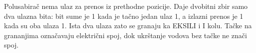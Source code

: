 Polusabirač nema ulaz za prenos iz prethodne pozicije. Daje dvobitni zbir samo dva ulazna bita: bit sume je 1 kada je tačno jedan ulaz 1, a izlazni prenos je 1 kada su oba ulaza 1. Ista dva ulaza zato se granaju ka EKSILI i I kolu. Tačke na grananjima označavaju električni spoj, dok ukrštanje vodova bez tačke ne znači spoj.
